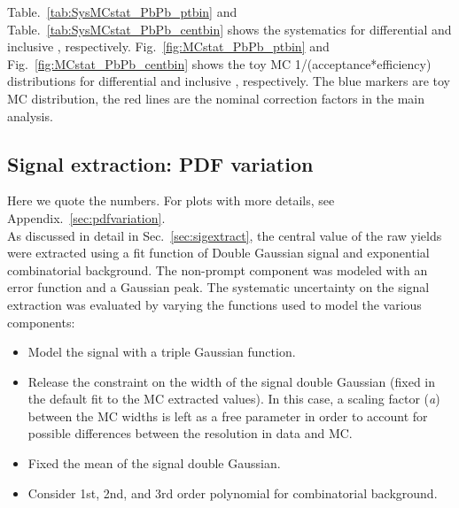 Table.~\ref{tab:SysMCstat_PbPb_ptbin} and Table.~\ref{tab:SysMCstat_PbPb_centbin} shows the systematics for differential \pt and inclusive \pt, respectively.
Fig.~\ref{fig:MCstat_PbPb_ptbin} and Fig.~\ref{fig:MCstat_PbPb_centbin} shows the toy MC 1/(acceptance*efficiency) distributions for differential \pt and inclusive \pt, respectively. The blue markers are toy MC distribution, the red lines are the nominal correction factors in the main analysis.



\clearpage

\subsection{Signal extraction: PDF variation}
Here we quote the numbers. For plots with more details, see Appendix.~\ref{sec:pdfvariation}. \\
As discussed in detail in Sec.~\ref{sec:sigextract}, the central value of the raw yields were extracted using a fit function of Double Gaussian signal and exponential combinatorial background. The non-prompt component was modeled with an error function and a Gaussian peak. The systematic uncertainty on the signal extraction was evaluated by varying the functions used to model the various components:

\begin{itemize}
\item Model the signal with a triple Gaussian function.
\item Release the constraint on the width of the signal double Gaussian (fixed in the default fit to the MC extracted values). In this case, a scaling factor (\textit{a}) between the MC widths is left as a free parameter in order to account for possible differences between the resolution in data and MC.
\item Fixed the mean of the signal double Gaussian.
\item Consider 1st, 2nd, and 3rd order polynomial for combinatorial background.
\end{itemize}

